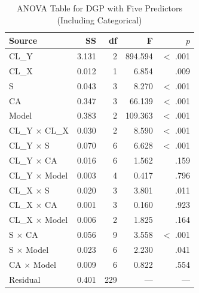 \documentclass[12pt]{article}
\begin{document}
\begin{table}[h]
    \centering
    \caption{ANOVA Table for DGP with Five Predictors (Including Categorical)}
    \label{tab:anova_v5}
    \vspace{0.2cm}
    \begin{tabular}{lrrrr}
        \toprule
        Source & SS & df & F & $p$ \\
        \midrule
        CL\_Y           & 3.131  & 2   & 894.594  & $<$ .001 \\
        CL\_X           & 0.012  & 1   & 6.854    & .009  \\
        S              & 0.043  & 3   & 8.270    & $<$ .001 \\
        CA             & 0.347  & 3   & 66.139   & $<$ .001 \\
        Model          & 0.383  & 2   & 109.363  & $<$ .001 \\
        CL\_Y $\times$ CL\_X  & 0.030  & 2   & 8.590    & $<$ .001 \\
        CL\_Y $\times$ S      & 0.070  & 6   & 6.628    & $<$ .001 \\
        CL\_Y $\times$ CA     & 0.016  & 6   & 1.562    & .159  \\
        CL\_Y $\times$ Model  & 0.003  & 4   & 0.417    & .796  \\
        CL\_X $\times$ S      & 0.020  & 3   & 3.801    & .011  \\
        CL\_X $\times$ CA     & 0.001  & 3   & 0.160    & .923  \\
        CL\_X $\times$ Model  & 0.006  & 2   & 1.825    & .164  \\
        S $\times$ CA         & 0.056  & 9   & 3.558    & $<$ .001 \\
        S $\times$ Model      & 0.023  & 6   & 2.230    & .041  \\
        CA $\times$ Model     & 0.009  & 6   & 0.822    & .554  \\
        Residual       & 0.401  & 229  & ---       & ---    \\
        \bottomrule
    \end{tabular}
\end{table}
\end{document}
